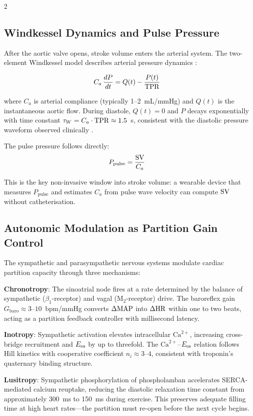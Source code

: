 \begin{multicols}{2}

\subsection{Windkessel Dynamics and Pulse Pressure}

After the aortic valve opens, stroke volume enters the arterial system.
The two-element Windkessel model describes arterial pressure dynamics
\citep{frank1899grundform,westerhof2009arterial}:

\begin{equation}
C_a\,\frac{dP}{dt} = Q(t) - \frac{P(t)}{\mathrm{TPR}}
\label{eq:ch09-windkessel}
\end{equation}

where $C_a$ is arterial compliance (typically 1--2~mL/mmHg) and
$Q(t)$ is the instantaneous aortic flow. During diastole, $Q(t) = 0$
and $P$ decays exponentially with time constant $\tau_W = C_a \cdot \mathrm{TPR}
\approx 1.5$~s, consistent with the diastolic pressure waveform
observed clinically \citep{nichols2011mcdonald}.

The pulse pressure follows directly:
\begin{equation}
P_{\mathrm{pulse}} = \frac{\mathrm{SV}}{C_a}
\label{eq:ch09-pulse}
\end{equation}

This is the key non-invasive window into stroke volume: a wearable
device that measures $P_{\mathrm{pulse}}$ and estimates $C_a$ from
pulse wave velocity can compute $\mathrm{SV}$ without catheterisation.

\columnbreak

\subsection{Autonomic Modulation as Partition Gain Control}

The sympathetic and parasympathetic nervous systems modulate cardiac
partition capacity through three mechanisms:

\noindent\textbf{Chronotropy}: The sinoatrial node fires at a rate
determined by the balance of sympathetic ($\beta_1$-receptor) and
vagal (M$_2$-receptor) drive. The baroreflex gain
$G_{\mathrm{baro}} \approx 3$--$10$~bpm/mmHg converts $\Delta\mathrm{MAP}$
into $\Delta\mathrm{HR}$ within one to two beats, acting as a partition
feedback controller with millisecond latency.

\noindent\textbf{Inotropy}: Sympathetic activation elevates
intracellular $\mathrm{Ca}^{2+}$, increasing cross-bridge recruitment
and $E_{\mathrm{es}}$ by up to threefold. The $\mathrm{Ca}^{2+}$--$E_{\mathrm{es}}$ relation
follows Hill kinetics with cooperative coefficient $n_i \approx 3$--$4$,
consistent with troponin's quaternary binding structure.

\noindent\textbf{Lusitropy}: Sympathetic phosphorylation of
phospholamban accelerates SERCA-mediated calcium reuptake, reducing
the diastolic relaxation time constant from approximately 300~ms to
150~ms during exercise. This preserves adequate filling time at high
heart rates---the partition must re-open before the next cycle begins.

\end{multicols}

